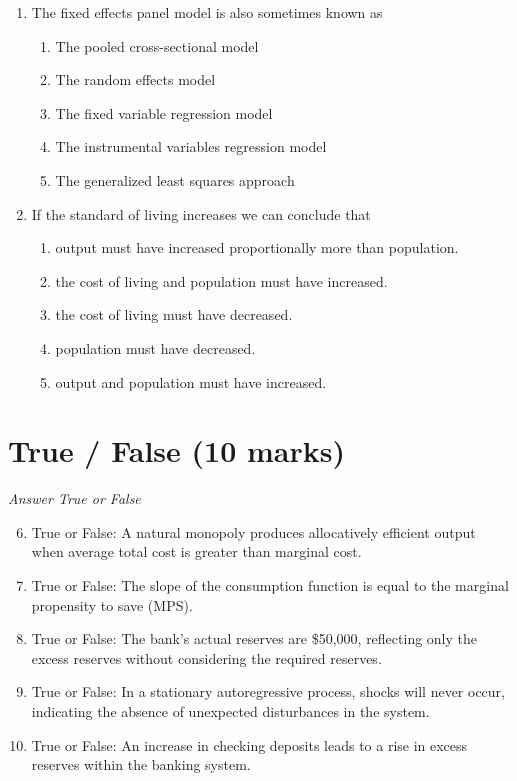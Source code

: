 \documentclass[12pt]{article}
\begin{document}
\begin{enumerate}[label=\arabic*.]
\item The fixed effects panel model is also sometimes known as
\begin{enumerate}[label=(\alph*)]
    \item The pooled cross-sectional model
    \item The random effects model
    \item The fixed variable regression model
    \item The instrumental variables regression model
    \item The generalized least squares approach
\end{enumerate}
\item If the standard of living increases we can conclude that
\begin{enumerate}[label=(\alph*)]
    \item output must have increased proportionally more than population.
    \item the cost of living and population must have increased.
    \item the cost of living must have decreased.
    \item population must have decreased.
    \item output and population must have increased.
\end{enumerate}
\end{enumerate}

\section*{True / False (10 marks)}
\textit{Answer True or False}
\begin{enumerate}[label=\arabic*.]
\setcounter{enumi}{5}
\item True or False: A natural monopoly produces allocatively efficient output when average total cost is greater than marginal cost.
\item True or False: The slope of the consumption function is equal to the marginal propensity to save (MPS).
\item True or False: The bank's actual reserves are \$50,000, reflecting only the excess reserves without considering the required reserves.
\item True or False: In a stationary autoregressive process, shocks will never occur, indicating the absence of unexpected disturbances in the system.
\item True or False: An increase in checking deposits leads to a rise in excess reserves within the banking system.
\end{enumerate}
\end{document}
